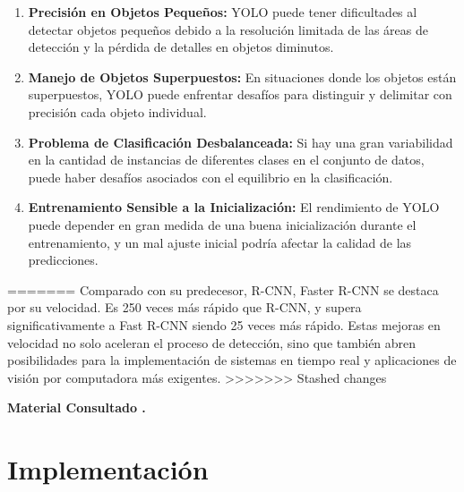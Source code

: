 	\begin{enumerate}
		\item \textbf{Precisión en Objetos Pequeños:} YOLO puede tener dificultades al detectar objetos pequeños debido a la resolución limitada de las áreas de detección y la pérdida de detalles en objetos diminutos.
    
    	\item \textbf{Manejo de Objetos Superpuestos:} En situaciones donde los objetos están superpuestos, YOLO puede enfrentar desafíos para distinguir y delimitar con precisión cada objeto individual.
    
   	 	\item \textbf{Problema de Clasificación Desbalanceada:} Si hay una gran variabilidad en la cantidad de instancias de diferentes clases en el conjunto de datos, puede haber desafíos asociados con el equilibrio en la clasificación.
    
    	\item \textbf{Entrenamiento Sensible a la Inicialización:} El rendimiento de YOLO puede depender en gran medida de una buena inicialización durante el entrenamiento, y un mal ajuste inicial podría afectar la calidad de las predicciones.	
	
	\end{enumerate}
	
	


	

=======
	Comparado con su predecesor, R-CNN, Faster R-CNN se destaca por su velocidad. Es 250 veces más rápido que R-CNN, y supera significativamente a Fast R-CNN siendo 25 veces más rápido. Estas mejoras en velocidad no solo aceleran el proceso de detección, sino que también abren posibilidades para la implementación de sistemas en tiempo real y aplicaciones de visión por computadora más exigentes.
>>>>>>> Stashed changes

        \begin{flushright}
        \textbf{Material Consultado \cite{cnn}.}
    \end{flushright}
    
\newpage

   
\section{Implementación}

